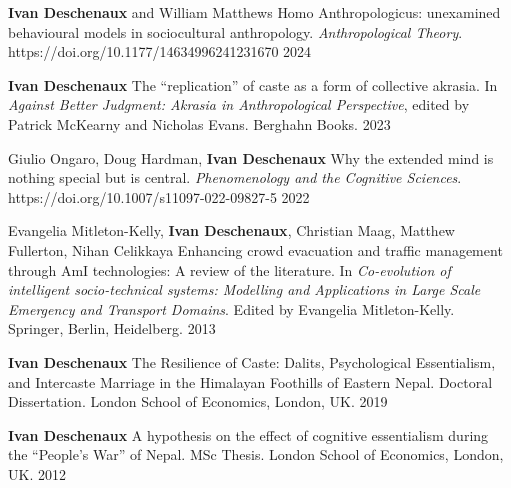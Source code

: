\begin{cvpublications}

  \cvpublication
  {\textbf{Ivan Deschenaux} and William Matthews}
  {Homo Anthropologicus: unexamined behavioural models in sociocultural anthropology. \textit{Anthropological Theory}. https://doi.org/10.1177/14634996241231670} %
  {2024} %

  \cvpublication
  {\textbf{Ivan Deschenaux}}
  {The ``replication'' of caste as a form of collective akrasia. In \textit{Against Better Judgment: Akrasia in Anthropological Perspective}, edited by Patrick McKearny and Nicholas Evans. Berghahn Books.} %
  {2023} %


  \cvpublication
  {Giulio Ongaro, Doug Hardman, \textbf{Ivan Deschenaux}}
  {Why the extended mind is nothing special but is central. \textit{Phenomenology and the Cognitive Sciences}. https://doi.org/10.1007/s11097-022-09827-5} %
  {2022} %

  \cvpublication
  {Evangelia Mitleton-Kelly, \textbf{Ivan Deschenaux}, Christian Maag, Matthew Fullerton, Nihan Celikkaya}
  {Enhancing crowd evacuation and traffic management through AmI technologies: A review of the literature. In \textit{Co-evolution of intelligent socio-technical systems: Modelling and Applications in Large Scale Emergency and Transport Domains}. Edited by Evangelia Mitleton-Kelly. Springer, Berlin, Heidelberg.} %
  {2013} %

\end{cvpublications}



\begin{cvpublications}

  \cvpublication
  {\textbf{Ivan Deschenaux}}
  {The Resilience of Caste: Dalits, Psychological Essentialism, and Intercaste Marriage in the Himalayan Foothills of Eastern Nepal. Doctoral Dissertation. London School of Economics, London, UK.} %
  {2019} %

  \cvpublication
  {\textbf{Ivan Deschenaux}}
  {A hypothesis on the effect of cognitive essentialism during the ``People's War'' of Nepal. MSc Thesis. London School of Economics, London, UK.} %
  {2012} %

\end{cvpublications}
